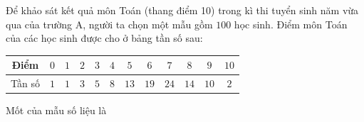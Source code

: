 \begin{ex}
Để khảo sát kết quả môn Toán (thang điểm 10) trong kì thi tuyển sinh năm vừa qua của trường A, người ta chọn một mẫu gồm $100$ học sinh. Điểm môn Toán của các học sinh được cho ở bảng tần số sau:
\begin{center}
\begin{tabular}{|c|c|c|c|c|c|c|c|c|c|c|c|}\hline
Điểm & $0$ & $1$ & $2$ & $3$ & $4$ & $5$ & $6$ & $7$ & $8$ & $9$ & $10$\\\hline
Tần số & $1$ & $1$ & $3$ & $5$ & $8$ & $13$ & $19$ & $24$ & $14$ & $10$ & $2$\\\hline
\end{tabular}
\end{center}
Mốt của mẫu số liệu là
\end{ex}
